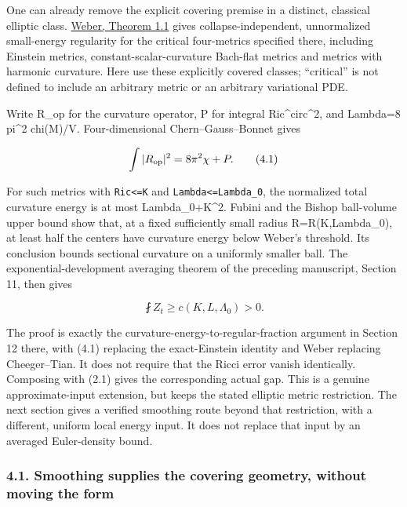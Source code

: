 \documentclass[
  10pt,
]{article}
\begin{document}
One can already remove the explicit covering premise in a distinct,
classical elliptic class.
\href{https://nyjm.albany.edu/j/2017/23-64p.pdf}{Weber, Theorem 1.1}
gives collapse-independent, unnormalized small-energy regularity for the
critical four-metrics specified there, including Einstein metrics,
constant-scalar-curvature Bach-flat metrics and metrics with harmonic
curvature. Here use these explicitly covered classes; ``critical'' is
not defined to include an arbitrary metric or an arbitrary variational
PDE.

Write R\_op for the curvature operator, P for integral
\textbar Ric\^{}circ\textbar\^{}2, and Lambda=8 pi\^{}2 chi(M)/V.
Four-dimensional Chern--Gauss--Bonnet gives

\[
                  \int|R_{\rm op}|^2=8\pi^2\chi+P.   \tag{4.1}
\]

For such metrics with \texttt{\textbar{}Ric\textbar{}\textless{}=K} and
\texttt{Lambda\textless{}=Lambda\_0}, the normalized total curvature
energy is at most Lambda\_0+K\^{}2. Fubini and the Bishop ball-volume
upper bound show that, at a fixed sufficiently small radius
R=R(K,Lambda\_0), at least half the centers have curvature energy below
Weber's threshold. Its conclusion bounds sectional curvature on a
uniformly smaller ball. The exponential-development averaging theorem of
the preceding manuscript, Section 11, then gives

\[
                   \fint Z_t\ge c(K,L,\Lambda_0)>0.  \tag{4.2}
\]

The proof is exactly the curvature-energy-to-regular-fraction argument
in Section 12 there, with (4.1) replacing the exact-Einstein identity
and Weber replacing Cheeger--Tian. It does not require that the Ricci
error vanish identically. Composing with (2.1) gives the corresponding
actual gap. This is a genuine approximate-input extension, but keeps the
stated elliptic metric restriction. The next section gives a verified
smoothing route beyond that restriction, with a different, uniform local
energy input. It does not replace that input by an averaged
Euler-density bound.

\hypertarget{smoothing-supplies-the-covering-geometry-without-moving-the-form}{%
\subsubsection{4.1. Smoothing supplies the covering geometry, without
moving the
form}\label{smoothing-supplies-the-covering-geometry-without-moving-the-form}}
\end{document}
